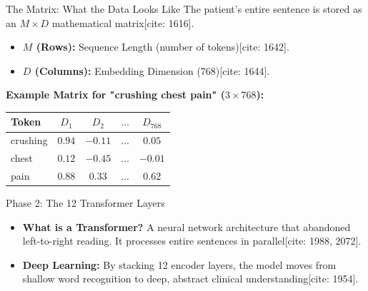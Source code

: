 \documentclass[10pt]{beamer}
\begin{document}
	\begin{frame}{The Matrix: What the Data Looks Like}
		The patient's entire sentence is stored as an $M \times D$ mathematical matrix[cite: 1616].
		\begin{itemize}
			\item \textbf{$M$ (Rows):} Sequence Length (number of tokens)[cite: 1642].
			\item \textbf{$D$ (Columns):} Embedding Dimension (768)[cite: 1644].
		\end{itemize}
		
		\vspace{0.2cm}
		\textbf{Example Matrix for "crushing chest pain" ($3 \times 768$):}
		\vspace{0.1cm}
		
		\begin{tabular}{|l|c|c|c|c|}
			\hline
			\textbf{Token} & $D_1$ & $D_2$ & $\dots$ & $D_{768}$ \\ \hline
			crushing & $0.94$ & $-0.11$ & $\dots$ & $0.05$ \\ \hline
			chest & $0.12$ & $-0.45$ & $\dots$ & $-0.01$ \\ \hline
			pain & $0.88$ & $0.33$ & $\dots$ & $0.62$ \\ \hline
		\end{tabular}
	\end{frame}
	
	\begin{frame}{Phase 2: The 12 Transformer Layers}
		\begin{center}
		\end{center}
		
		\begin{itemize}
			\item \textbf{What is a Transformer?} A neural network architecture that abandoned left-to-right reading. It processes entire sentences in parallel[cite: 1988, 2072].
			\item \textbf{Deep Learning:} By stacking 12 encoder layers, the model moves from shallow word recognition to deep, abstract clinical understanding[cite: 1954].
		\end{itemize}
	\end{frame}
	
\end{document}
